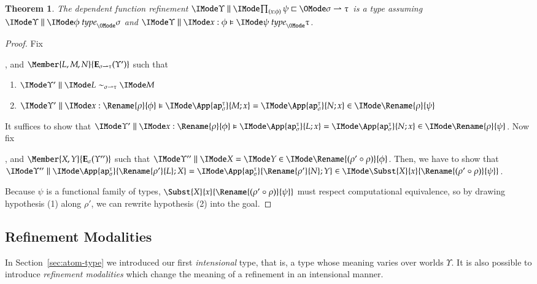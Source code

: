 \documentclass[11pt]{article}
\newtheorem{thm}{Theorem}[section]
\theoremstyle{definition}
\theoremstyle{notation}
\theoremstyle{remark}
\numberwithin{equation}{section}
\newcommand\Exprs{\mathbf{E}}
\begin{document}
\begin{thm}
  The dependent function refinement
  $\Refines{\Upsilon}{\prod_{(x:\phi)}\psi}{\SortArr{\sigma}{\tau}}$ is a
  type assuming $\IsType{\Upsilon}{\phi}{\sigma}$ and
  $\IsTypeFam{\Upsilon}{x:\phi}{\psi}{\tau}$.
\end{thm}
\begin{proof}
  Fix
  , and $\Member{L,M,N}{\Exprs_{\SortArr{\sigma}{\tau}}(\Upsilon')}$ such that
  \begin{enumerate}
    \item $\PBinRel{\sim_{\SortArr{\sigma}{\tau}}}{\Upsilon'}{L}{M}$
    \item $\FRMemEq{\Upsilon'}{x:\Rename{\rho}{\phi}}{\App{\OpAp{\sigma}{\tau}}{M;x}}{\App{\OpAp{\sigma}{\tau}}{N;x}}{\Rename{\rho}{\psi}}$
  \end{enumerate}
%
  It suffices to show that
  $\FRMemEq{\Upsilon'}{x:\Rename{\rho}{\phi}}{\App{\OpAp{\sigma}{\tau}}{L;x}}{\App{\OpAp{\sigma}{\tau}}{N;x}}{\Rename{\rho}{\psi}}$.
%
  Now fix
  , and $\Member{X,Y}{\Exprs_\sigma(\Upsilon'')}$ such that
  $\RMemEq{\Upsilon''}{X}{Y}{\Rename{(\rho'\circ\rho)}{\phi}}$.
  Then, we have to show that
  $\RMemEq{\Upsilon''}{%
    \App{\OpAp{\sigma}{\tau}}{
      \Rename{\rho'}{L};
      X
    }
  }{
    \App{\OpAp{\sigma}{\tau}}{
      \Rename{\rho'}{N};
      Y
    }
  }{\Subst{X}{x}{\Rename{(\rho'\circ\rho)}{\psi}}}$.

  Because $\psi$ is a functional family of types,
  $\Subst{X}{x}{\Rename{(\rho'\circ\rho)}{\psi}}$ must respect
  computational equivalence, so by drawing hypothesis (1) along $\rho'$, we
  can rewrite hypothesis (2) into the goal.
\end{proof}

\subsection{Refinement Modalities}

In Section~\ref{sec:atom-type} we introduced our first \emph{intensional} type,
that is, a type whose meaning varies over worlds $\Upsilon$. It is also
possible to introduce \emph{refinement modalities} which change the
meaning of a refinement in an intensional manner.
\end{document}
